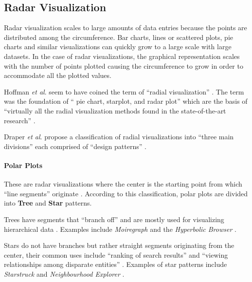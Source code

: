 \documentclass[twocolumn]{bmcart}%
\begin{document}
\subsection*{Radar Visualization}


Radar visualization scales to large amounts of data entries because the points are distributed among the circumference. Bar charts, lines or scattered plots, pie charts and similar visualizations can quickly grow to a large scale with large datasets. In the case of radar visualizations, the graphical representation scales with the number of points plotted causing the circumference to grow in order to accommodate all the plotted values. 


Hoffman \textit{et al}. seem to have coined the term of ``radial visualization'' \cite{hoffman1997dna, draper2009survey}. The term was the foundation of `` pie chart, starplot, and radar plot'' which are the basis of ``virtually all the radial visualization methods found in the state-of-the-art research'' \cite{draper2009survey}.

Draper \textit{et al}. propose a classification of radial visualizations into ``three main divisions'' each comprised of ``design patterns'' \cite{draper2009survey}.

\paragraph*{Polar Plots}
These are radar visualizations where the center is the starting point from which ``line segments'' originate \cite{draper2009survey}. According to this classification, polar plots are divided into \textbf{Tree} and \textbf{Star} patterns.

Trees have segments that ``branch off'' and are mostly used for visualizing hierarchical data \cite{draper2009survey}. Examples include \textit{Moiregraph} \cite{draper2009survey, jankun2003moiregraphs} and the \textit{Hyperbolic Browser} \cite{draper2009survey, lamping1996hyperbolic}.

Stars do not have branches but rather straight segments originating from the center, their common uses include ``ranking of search results'' and ``viewing relationships among disparate entities'' \cite{draper2009survey}. Examples of star patterns include  \textit{Starstruck} \cite{draper2009survey, hetzler1998multi} and \textit{Neighbourhood Explorer} \cite{draper2009survey, Spence2001Information}.
\end{document}
